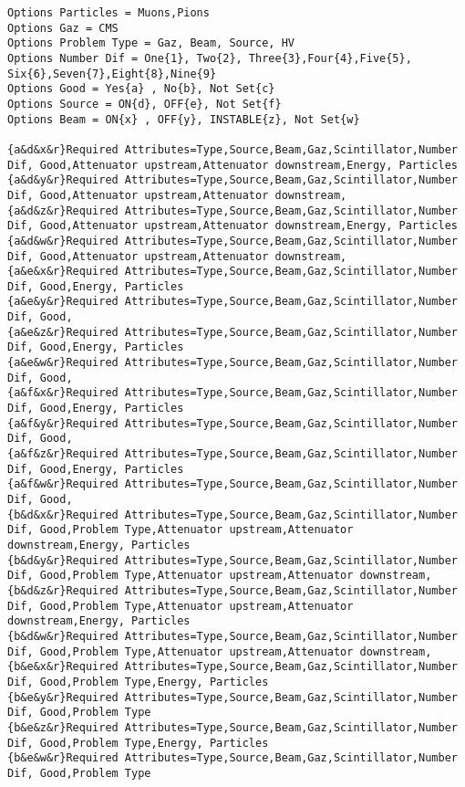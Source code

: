 {\begin{lstlisting}[breaklines=true,basicstyle=\tiny,postbreak=\mbox{\textcolor{red}{$\hookrightarrow$}\space},]
Options Particles = Muons,Pions
Options Gaz = CMS
Options Problem Type = Gaz, Beam, Source, HV
Options Number Dif = One{1}, Two{2}, Three{3},Four{4},Five{5}, Six{6},Seven{7},Eight{8},Nine{9}
Options Good = Yes{a} , No{b}, Not Set{c}
Options Source = ON{d}, OFF{e}, Not Set{f}
Options Beam = ON{x} , OFF{y}, INSTABLE{z}, Not Set{w}

{a&d&x&r}Required Attributes=Type,Source,Beam,Gaz,Scintillator,Number Dif, Good,Attenuator upstream,Attenuator downstream,Energy, Particles
{a&d&y&r}Required Attributes=Type,Source,Beam,Gaz,Scintillator,Number Dif, Good,Attenuator upstream,Attenuator downstream,
{a&d&z&r}Required Attributes=Type,Source,Beam,Gaz,Scintillator,Number Dif, Good,Attenuator upstream,Attenuator downstream,Energy, Particles
{a&d&w&r}Required Attributes=Type,Source,Beam,Gaz,Scintillator,Number Dif, Good,Attenuator upstream,Attenuator downstream,
{a&e&x&r}Required Attributes=Type,Source,Beam,Gaz,Scintillator,Number Dif, Good,Energy, Particles
{a&e&y&r}Required Attributes=Type,Source,Beam,Gaz,Scintillator,Number Dif, Good,
{a&e&z&r}Required Attributes=Type,Source,Beam,Gaz,Scintillator,Number Dif, Good,Energy, Particles
{a&e&w&r}Required Attributes=Type,Source,Beam,Gaz,Scintillator,Number Dif, Good,
{a&f&x&r}Required Attributes=Type,Source,Beam,Gaz,Scintillator,Number Dif, Good,Energy, Particles
{a&f&y&r}Required Attributes=Type,Source,Beam,Gaz,Scintillator,Number Dif, Good,
{a&f&z&r}Required Attributes=Type,Source,Beam,Gaz,Scintillator,Number Dif, Good,Energy, Particles
{a&f&w&r}Required Attributes=Type,Source,Beam,Gaz,Scintillator,Number Dif, Good,
{b&d&x&r}Required Attributes=Type,Source,Beam,Gaz,Scintillator,Number Dif, Good,Problem Type,Attenuator upstream,Attenuator downstream,Energy, Particles
{b&d&y&r}Required Attributes=Type,Source,Beam,Gaz,Scintillator,Number Dif, Good,Problem Type,Attenuator upstream,Attenuator downstream,
{b&d&z&r}Required Attributes=Type,Source,Beam,Gaz,Scintillator,Number Dif, Good,Problem Type,Attenuator upstream,Attenuator downstream,Energy, Particles
{b&d&w&r}Required Attributes=Type,Source,Beam,Gaz,Scintillator,Number Dif, Good,Problem Type,Attenuator upstream,Attenuator downstream,
{b&e&x&r}Required Attributes=Type,Source,Beam,Gaz,Scintillator,Number Dif, Good,Problem Type,Energy, Particles
{b&e&y&r}Required Attributes=Type,Source,Beam,Gaz,Scintillator,Number Dif, Good,Problem Type
{b&e&z&r}Required Attributes=Type,Source,Beam,Gaz,Scintillator,Number Dif, Good,Problem Type,Energy, Particles
{b&e&w&r}Required Attributes=Type,Source,Beam,Gaz,Scintillator,Number Dif, Good,Problem Type

\end{lstlisting}}
